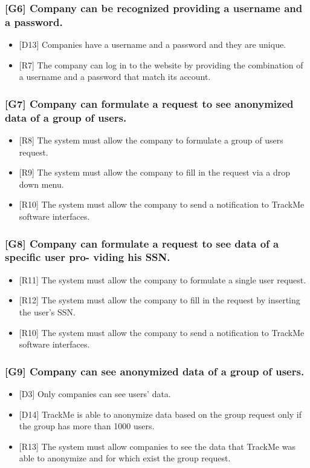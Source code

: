 \documentclass{article}
\begin{document}
\subsubsection{[G6]  Company can be recognized providing a username and a password.}
\begin{itemize}
\item {[D13]} Companies have a username and a password and they are unique.
\item {[R7]} The company can log in to the website by providing the combination of a username and a password that match its account.
\end{itemize}
\subsubsection{[G7] Company can formulate a request to see anonymized data of a group of users.}
\begin{itemize}
\item {[R8]} The system must allow the company to formulate a group of users request.
\item {[R9]} The system must allow the company to fill in the request via a drop down menu.
\item {[R10]} The system must allow the company to send a notification to TrackMe software interfaces.
\end{itemize}
\subsubsection{[G8] Company can formulate a request to see data of a specific user pro- viding his SSN.}
\begin{itemize}
\item {[R11]} The system must allow the company to formulate a single user request.
\item {[R12]} The system must allow the company to fill in the request by inserting the user's SSN.
\item {[R10]} The system must allow the company to send a notification to TrackMe software interfaces.
\end{itemize}
\subsubsection{[G9] Company can see anonymized data of a group of users.}
\begin{itemize}
\item {[D3]} Only companies can see users’ data.
\item {[D14]} TrackMe is able to anonymize data based on the group request only if the group has more than 1000 users.
\item {[R13]} The system must allow companies to see the data that TrackMe was able to anonymize and for which exist the group request.
\end{itemize}
\end{document}
